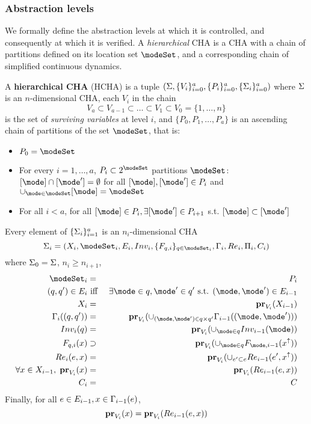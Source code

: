 \subsubsection{Abstraction levels}
\label{abstractionLevelsOfHCHA}

We formally define the abstraction levels at which it is controlled, and consequently at which it is verified.
A \emph{hierarchical} CHA is a CHA with a chain of partitions defined on its location set $\modeSet$, and a corresponding chain of simplified continuous dynamics.
\begin{defn}
	\label{def:HCHA}
	A \textbf{hierarchical CHA} (HCHA) is a tuple 
	$(\Sys, \{V_i\}_{i=0}^{a}, \{P_i\}_{i=0}^{a}, \{\Sys_i\}_{i=0}^{a})$ where 
	$\Sys$ is an $n$-dimensional CHA, 
	each $V_i$ in the chain 
	\[V_a \subset V_{a-1} \subset \ldots \subset V_1 \subset V_0=\{1,\ldots,n\}\]
	is the set of \emph{surviving variables} at level $i$, and 
	$\{P_0,P_1,\ldots,P_a\}$ is an ascending chain of partitions of the set $\modeSet$, that is:
	\begin{itemize}
		\item $P_0 = \modeSet$
		\item For every $i =1,\ldots,a$, $P_i \subset 2^\modeSet$ partitions $\modeSet$: $[\mode] \cap [\mode'] = \emptyset$ for all $[\mode],[\mode'] \in P_i$ and $\cup_{\mode\in \modeSet}[\mode] = \modeSet$
		\item For all $i<a$, for all $[\mode]\in P_i, \exists [\mode'] \in P_{i+1}$ s.t. $[\mode] \subset [\mode']$ 
	\end{itemize}
	Every element of $\{\Sys_i\}_{i=1}^{a}$ is an $n_i$-dimensional CHA 
	\[\Sys_i = (\stSet_i, \modeSet_i, E_i, Inv_i, \{F_{q,i}\}_{q \in \modeSet_i}, \guard_i, \reset_i, \funcOut_i, C_i)\]
	where  $\Sys_0 = \Sys$,
	$n_i \geq n_{i+1}$,
	\begin{eqnarray*}
		\modeSet_i &=& P_i
		\\
		(q,q') \in E_i &\text{ iff }& \exists \mode \in q, \mode' \in q' \text{ s.t. } (\mode,\mode') \in E_{i-1}		
		\\
		\stSet_i & = & \proj{\stSet_{i-1}}{V_i} 
		\\
		\guard_i((q,q')) &=& \proj{\cup_{(\mode,\mode') \in q\times q'} \guard_{i-1}((\mode,\mode')) }{V_i}
		\\
		Inv_i(q) &=& \proj{ \cup_{\mode \in q}Inv_{i-1}(\mode)}{V_i}
		\\
		F_{q,i}(x) &\supset & \proj{\cup_{\mode \in q}F_{\mode,i-1}(x^\uparrow)}{V_i}
		\\
		\reset_i(e,x) &=& \proj{\cup_{e' \subset e}\reset_{i-1}(e',x^{\uparrow})}{V_i}
		\\
		\forall x \in \stSet_{i-1},\; \proj{x}{V_i} &=& \proj{\reset_{i-1}(e,x)}{V_i}
		\\
		C_i &=& C
		\end{eqnarray*}
Finally, for all $ e \in E_{i-1},x \in \guard_{i-1}(e)$,
\[\proj{x}{V_i} = \proj{\reset_{i-1}(e,x)}{V_i}\]
		
\end{defn}
